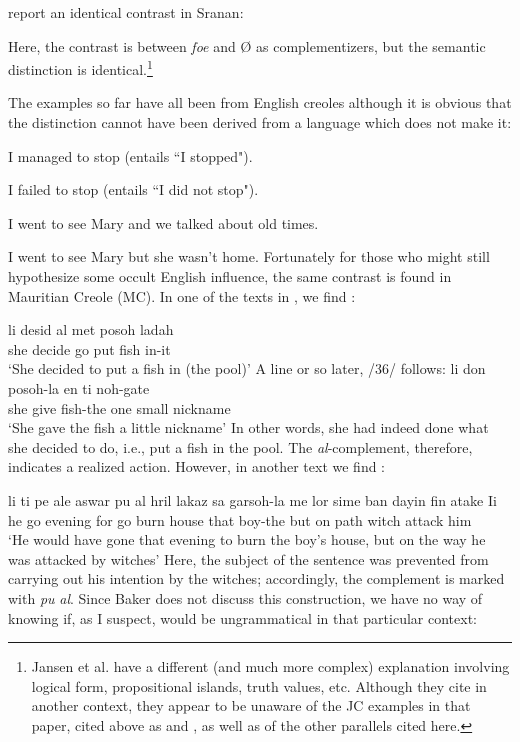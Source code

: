 \citet{JansenEtAl1978} report an identical contrast in Sranan:

\z

\label{ex:2:30}\z
Here, the contrast is between \textit{foe} and {\O} as complementizers, but the
semantic distinction is identical.\footnote{Jansen et al. have a different (and much more complex) explanation involving logical form, propositional islands, truth values, etc. Although they cite \citet{Roberts1975} in another context, they appear to be unaware of the JC examples in that paper, cited above as  and , as well as of the other parallels cited here.}

The examples so far have all been from English creoles although it is obvious that the distinction cannot have been derived from a lan\-guage which does not make it:

\ea\label{ex:2:31}
 {I} {managed} {to} {stop} {\rm (entails ``I stopped")}.
\z

\ea\label{ex:2:32}
 {I} {failed} {to} {stop} {\rm (entails ``I did not stop")}.
\z

\ea\label{ex:2:33}
I {went} {to} {see} {Mary} {and} {we} {talked} {about} {old} {times.}
\z

\ea\label{ex:2:34}
 {I} {went} {to} {see} {Mary} {but} {she} {wasn't} {home.}
\z
Fortunately for those who might still hypothesize some occult English influence, the same contrast is found in Mauritian Creole (MC). In one of the texts in \citet{Baker1972}, we find :

\ea\label{ex:2:35}
\gll  li desid al met posoh ladah \\
she decide go put fish in-it\\
\glt `She decided to put a fish in (the pool)'
\z
A line or so later, /36/ follows:
\ea\label{ex:2:36}
 \gll li don posoh-la en ti noh-gate\\
she give fish-the one small nickname\\
\glt `She gave the fish a little nickname'
\z
% 
In other words, she had indeed done what she decided to do, i.e., put a fish in the pool. The \textit{al}-complement, therefore, indicates a realized action. However, in another text we find :

\ea\label{ex:2:37}
 \gll li ti pe ale aswar pu al hril lakaz sa garsoh-la me lor sime ban dayin fin atake Ii\\
he {\TNS} {\MOD} go evening for go burn house that boy-the  but on path {\PL} witch {\COMP} attack him\\
\glt `He would have gone that evening to burn the boy's house, but on the way he was attacked by witches'
\z
Here, the subject of the sentence was prevented from carrying out his intention by the witches; accordingly, the complement is marked with \textit{pu} \textit{al}. Since Baker does not discuss this construction, we have no way of knowing if, as I suspect,  would be ungrammatical in that particular context:

